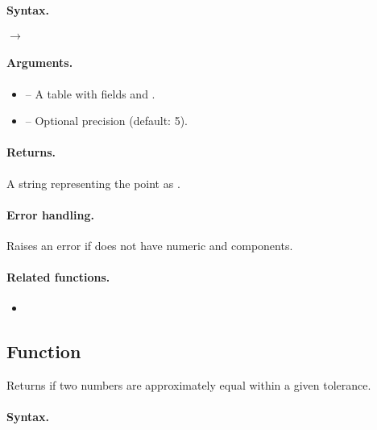 \paragraph{Syntax.}
\begin{center}
 \hfill $\rightarrow$ 
\end{center}

\paragraph{Arguments.}
\begin{itemize}
\item {} – A table with fields  and .
\item {} – Optional precision (default: 5).
\end{itemize}

\paragraph{Returns.}
A string representing the point as .

\paragraph{Error handling.}
Raises an error if  does not have numeric  and  components.

\paragraph{Related functions.}
\begin{itemize}
\item {}
\end{itemize}


\subsection{Function } %
\label{sub:function_utils_almost_equal}

Returns  if two numbers are approximately equal within a given tolerance.

\paragraph{Syntax.}
\begin{center}
\end{center}


